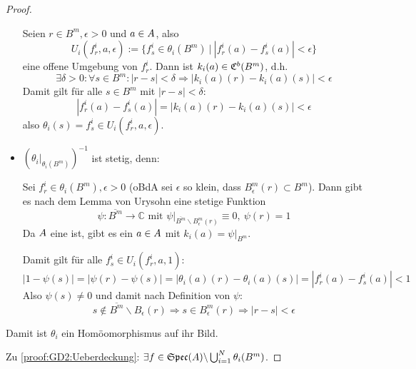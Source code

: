\begin{proof}
\begin{itemize}
	Seien $r \in B^m, \epsilon > 0$ und $a \in A$, also
	\[U_i(f_r^i, a, \epsilon) := \{f_s^i \in \theta_i(B^m) ~\big|~ |f_r^i(a) - f_s^i(a)| < \epsilon\}\]
	eine offene Umgebung von $f_r^i$. Dann ist $k_i(a) \in \mathfrak{C}^b(B^m)$, d.h. 
	\[\exists \delta >0: \forall s \in B^m: |r-s| <\delta \Rightarrow |k_i(a)(r) - k_i(a)(s)| < \epsilon\]
	Damit gilt für alle $s \in B^m$ mit $|r-s| < \delta$:
	\[ |f_r^i(a) - f_s^i(a)| = |k_i(a)(r) - k_i(a)(s)| < \epsilon \]
	also $\theta_i(s) = f_s^i \in U_i(f_r^i, a, \epsilon)$.
	
	\item $(\theta_i|_{\theta_i(B^m)})^{-1}$ ist stetig, denn:
	
	Sei $f_r^i \in \theta_i(B^m), \epsilon>0$ (oBdA sei $\epsilon$ so klein, dass $B_\epsilon^m(r) \subset B^m$). Dann gibt es nach dem Lemma von Urysohn eine stetige Funktion
	\[\psi: \overline{B^m} \to \mathbb{C} \text{ mit } \psi|_{\overline{B^m}\backslash B_\epsilon^m(r)} \equiv 0, ~\psi(r) = 1\]
	Da $A$ eine \CAlgMan{} ist, gibt es ein $a \in A$ mit $k_i(a) = \psi|_{B^m}$.
	
	Damit gilt für alle $f_s^i \in U_i(f_r^i, a, 1)$:
	\[|1 - \psi(s)| = |\psi(r) - \psi(s)| = |\theta_i(a)(r) - \theta_i(a)(s)| = |f_r^i(a) - f_s^i(a)| < 1\]
	Also $\psi(s) \neq 0$ und damit nach Definition von $\psi$:
	\[s \notin \overline{B^m}\backslash B_\epsilon(r) \Rightarrow s \in B_\epsilon^m(r) \Rightarrow |r-s| < \epsilon\]
\end{itemize}
Damit ist $\theta_i$ ein Homöomorphismus auf ihr Bild.

Zu \ref{proof:GD2:Ueberdeckung}: \Ann $\exists f \in \mathfrak{Spec}(A) \backslash \bigcup_{i=1}^N \theta_i(B^m)$.


\end{proof}

